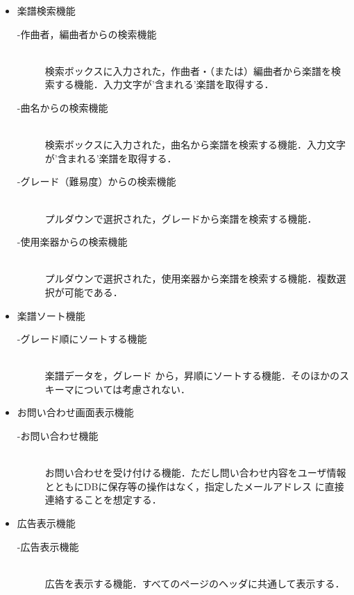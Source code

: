 \begin{itemize}
    \item 楽譜検索機能
          \begin{description}
              \item[-作曲者，編曲者からの検索機能]\mbox{}\\
              検索ボックスに入力された，作曲者・（または）編曲者から楽譜を検索する機能．入力文字が'含まれる'楽譜を取得する．
              \item[-曲名からの検索機能] \mbox{}\\
                  検索ボックスに入力された，曲名から楽譜を検索する機能．入力文字が'含まれる'楽譜を取得する．
              \item[-グレード（難易度）からの検索機能] \mbox{}\\
                  プルダウンで選択された，グレードから楽譜を検索する機能．
              \item[-使用楽器からの検索機能] \mbox{}\\
                  プルダウンで選択された，使用楽器から楽譜を検索する機能．複数選択が可能である．
          \end{description}
    \item 楽譜ソート機能
          \begin{description}
              \item[-グレード順にソートする機能] \mbox{}\\
                  楽譜データを，グレード
                  から，昇順にソートする機能．そのほかのスキーマについては考慮されない．
          \end{description}
    \item お問い合わせ画面表示機能
          \begin{description}
              \item[-お問い合わせ機能]\mbox{}\\
              お問い合わせを受け付ける機能．ただし問い合わせ内容をユーザ情報とともにDBに保存等の操作はなく，指定したメールアドレス
              に直接連絡することを想定する．
          \end{description}
    \item 広告表示機能
          \begin{description}
              \item[-広告表示機能]\mbox{}\\
              広告を表示する機能．すべてのページのヘッダに共通して表示する．
          \end{description}
\end{itemize}

